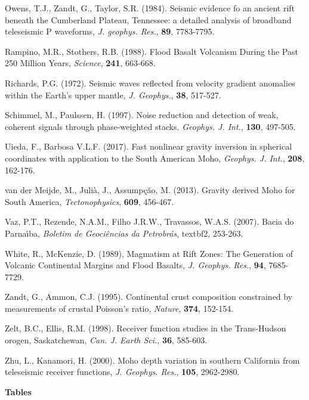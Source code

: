 \documentclass[manuscript,11pt]{geophysics}
\begin{document}
Owens, T.J., Zandt, G., Taylor, S.R. (1984). Seismic evidence fo an ancient rift beneath the Cumberland Plateau, Tennessee: a detailed analysis of broadband teleseismic P waveforms, \textit{J. geophys. Res.}, \textbf{89}, 7783-7795.

Rampino, M.R., Stothers, R.B. (1988). Flood Basalt Volcanism During the Past 250 Million Years, \textit{Science}, \textbf{241}, 663-668. 

Richards, P.G. (1972). Seismic waves reflected from velocity gradient anomalies within the Earth's upper mantle, \textit{J. Geophys.}, \textbf{38}, 517-527.

Schimmel, M., Paulssen, H. (1997). Noise reduction and detection of weak, coherent signals through phase-weighted stacks. \textit{Geophys. J. Int.}, \textbf{130}, 497-505.

Uieda, F., Barbosa V.L.F. (2017). Fast nonlinear gravity inversion in spherical coordinates with application to the South American Moho, \textit{Geophys. J. Int.}, \textbf{208}, 162-176.

van der Meijde, M., Juli\`a, J., Assump\c{c}\~ao, M. (2013). Gravity derived Moho for South America, \textit{Tectonophysics}, \textbf{609}, 456-467.

Vaz, P.T., Rezende, N.A.M., Filho J.R.W., Travassos, W.A.S. (2007). Bacia do Parna\'{\i}ba, \textit{Boletim de Geoci\^encias da Petrobr\'as}, textbf{2}, 253-263.

White, R., McKenzie, D. (1989), Magmatism at Rift Zones: The Generation of Volcanic Continental Margins and Flood Basalts, \textit{J. Geophys. Res.}, \textbf{94}, 7685-7729.

Zandt, G., Ammon, C.J. (1995). Continental crust composition constrained by measurements of crustal Poisson's ratio, \textit{Nature}, \textbf{374}, 152-154.

Zelt, B.C., Ellis, R.M. (1998). Receiver function studies in the Trans-Hudson orogen, Saskatchewan, \textit{Can. J. Earth Sci.}, \textbf{36}, 585-603.

Zhu, L., Kanamori, H. (2000). Moho depth variation in southern California from teleseismic receiver functions, \textit{J. Geophys. Res.}, \textbf{105}, 2962-2980.

%
%

\pagebreak

\begin{flushleft}
\textbf{\LARGE Tables}
\end{flushleft}
\end{document}
